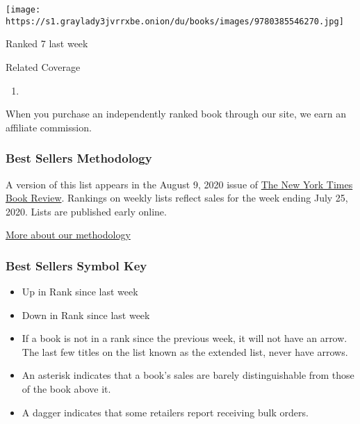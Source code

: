 \begin{enumerate}
  \texttt{[image: https://s1.graylady3jvrrxbe.onion/du/books/images/9780385546270.jpg]}

  Ranked 7 last week
\end{enumerate}

Related Coverage

\begin{enumerate}
\def\labelenumi{\arabic{enumi}.}
\tightlist
\item
  \href{https://www.nytimes3xbfgragh.onion/2020/07/31/books/review/the-system-robert-reich-break-em-up-zephyr-teachout.html}{}
\end{enumerate}

When you purchase an independently ranked book through our site, we earn
an affiliate commission.

\hypertarget{best-sellers-methodology}{%
\subsubsection{Best Sellers
Methodology}\label{best-sellers-methodology}}

A version of this list appears in the August 9, 2020 issue of
\href{http://www.nytimes3xbfgragh.onion/section/books/review}{The New
York Times Book Review}. Rankings on weekly lists reflect sales for the
week ending July 25, 2020. Lists are published early online.

\href{/books/best-sellers/methodology/}{More about our methodology}

\hypertarget{best-sellers-symbol-key}{%
\subsubsection{Best Sellers Symbol Key}\label{best-sellers-symbol-key}}

\begin{itemize}
\item
  Up in Rank since last week
\item
  Down in Rank since last week
\item
  If a book is not in a rank since the previous week, it will not have
  an arrow. The last few titles on the list known as the extended list,
  never have arrows.
\item
  An asterisk indicates that a book's sales are barely distinguishable
  from those of the book above it.
\item
  A dagger indicates that some retailers report receiving bulk orders.
\end{itemize}

